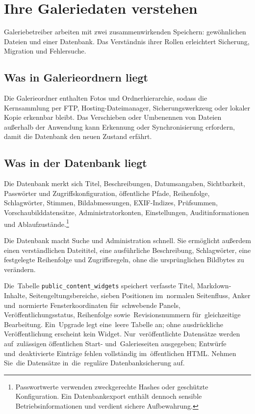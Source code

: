 \documentclass[11pt,a4paper]{article}
\begin{document}
\section{Ihre Galeriedaten verstehen}
\label{sec:user-data}

Galeriebetreiber arbeiten mit zwei zusammenwirkenden Speichern: gewöhnlichen
Dateien und einer Datenbank. Das Verständnis ihrer Rollen erleichtert Sicherung,
Migration und Fehlersuche.

\subsection{Was in Galerieordnern liegt}

Die Galerieordner enthalten Fotos und Ordnerhierarchie, sodass die Kernsammlung
per FTP, Hosting-Dateimanager, Sicherungswerkzeug oder lokaler Kopie erkennbar
bleibt. Das Verschieben oder Umbenennen von Dateien außerhalb der Anwendung kann
Erkennung oder Synchronisierung erfordern, damit die Datenbank den neuen Zustand
erfährt.

\subsection{Was in der Datenbank liegt}

Die Datenbank merkt sich Titel, Beschreibungen, Datumsangaben, Sichtbarkeit,
Passwörter und Zugriffskonfiguration, öffentliche Pfade, Reihenfolge,
Schlagwörter, Stimmen, Bildabmessungen, EXIF-Indizes, Prüfsummen,
Vorschaubilddatensätze, Administratorkonten, Einstellungen, Auditinformationen
und Ablaufzustände.\footnote{Passwortwerte verwenden zweckgerechte Hashes oder
geschützte Konfiguration. Ein Datenbankexport enthält dennoch sensible
Betriebsinformationen und verdient sichere Aufbewahrung.}

Die Datenbank macht Suche und Administration schnell. Sie ermöglicht außerdem
einen verständlichen Dateititel, eine ausführliche Beschreibung, Schlagwörter,
eine festgelegte Reihenfolge und Zugriffsregeln, ohne die ursprünglichen
Bildbytes zu verändern.

Die~Tabelle \texttt{public\_content\_widgets} speichert verfasste Titel,
Markdown-Inhalte, Seitengeltungsbereiche, sieben Positionen im~normalen
Seitenfluss, Anker und~normierte Fensterkoordinaten für~schwebende Panels,
Veröffentlichungsstatus, Reihenfolge sowie~Revisionsnummern für~gleichzeitige
Bearbeitung. Ein~Upgrade legt eine~leere Tabelle an; ohne ausdrückliche
Veröffentlichung erscheint kein Widget. Nur~veröffentlichte Datensätze werden
auf~zulässigen öffentlichen Start- und~Galerieseiten ausgegeben; Entwürfe
und~deaktivierte Einträge fehlen vollständig im~öffentlichen HTML. Nehmen
Sie~die Datensätze in~die~reguläre Datenbanksicherung auf.
\end{document}
